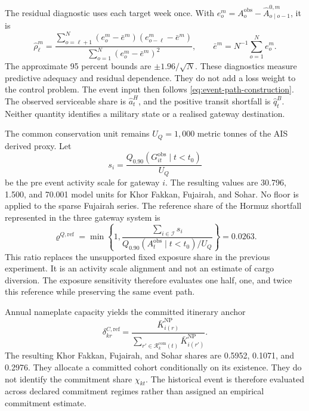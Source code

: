 \documentclass[a4paper,fleqn]{cas-sc}
\begin{document}
The residual diagnostic uses each target week once. With
$e_o^m=A_o^{\mathrm{obs}}-\widehat A^{0,m}_{o\mid o-1}$, it is
\begin{equation}
 \widehat\rho^m_{\ell}=
 \frac{\sum_{o=\ell+1}^{N}(e_o^m-\bar e^m)
 (e_{o-\ell}^m-\bar e^m)}
 {\sum_{o=1}^{N}(e_o^m-\bar e^m)^2},
 \qquad
 \bar e^m=N^{-1}\sum_{o=1}^{N}e_o^m.
 \label{eq:counterfactual-residual-acf}
\end{equation}
The approximate 95 percent bounds are $\pm1.96/\sqrt{N}$. These diagnostics
measure predictive adequacy and residual dependence. They do not add a loss
weight to the control problem. The event input then follows
\cref{eq:event-path-construction}. The observed serviceable share is
$\widehat a_t^H$, and the positive transit shortfall is $\widehat q_t^B$.
Neither quantity identifies a military state or a realised gateway destination.

The common conservation unit remains $U_Q=1{,}000$ metric tonnes of the AIS
derived proxy. Let
\begin{equation}
 s_i=\frac{Q_{0.90}\!\left(G^{\mathrm{obs}}_{it}\mid t<t_0\right)}{U_Q}
 \label{eq:gateway-activity-scale}
\end{equation}
be the pre event activity scale for gateway $i$. The resulting values are
30.796, 1.500, and 70.001 model units for Khor Fakkan, Fujairah, and Sohar.
No floor is applied to the sparse Fujairah series. The reference share of the
Hormuz shortfall represented in the three gateway system is
\begin{equation}
 \varrho^{Q,\mathrm{ref}}=
 \min\left\{1,
 \frac{\sum_{i\in\mathcal I}s_i}
 {Q_{0.90}(A_t^{\mathrm{obs}}\mid t<t_0)/U_Q}
 \right\}=0.0263.
 \label{eq:network-exposure-reference}
\end{equation}
This ratio replaces the unsupported fixed exposure share in the previous
experiment. It is an activity scale alignment and not an estimate of cargo
diversion. The exposure sensitivity therefore evaluates one half, one, and twice this
reference while preserving the same event path.

Annual nameplate capacity yields the committed itinerary anchor
\begin{equation}
 \delta^{C,\mathrm{ref}}_{kr}=
 \frac{\bar K_{i(r)}^{\mathrm{NP}}}
 {\sum_{r'\in\mathcal R_k^{\mathrm{com}}(t)}
  \bar K_{i(r')}^{\mathrm{NP}}}.
 \label{eq:committed-allocation-reference}
\end{equation}
The resulting Khor Fakkan, Fujairah, and Sohar shares are 0.5952, 0.1071, and
0.2976. They allocate a committed cohort conditionally on its existence. They
do not identify the commitment share $\chi_{kt}$. The historical event is
therefore evaluated across declared commitment regimes rather than assigned an
empirical commitment estimate.
\end{document}
